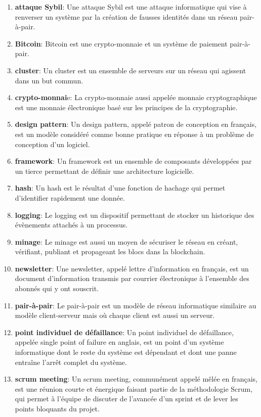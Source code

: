 \documentclass{tnreport}
\begin{document}
\begin{enumerate}
	\item \textbf{attaque Sybil}: Une attaque Sybil est une attaque informatique qui vise à renverser un système par la création de fausses identités dans un réseau pair-à-pair.
	\item \textbf{Bitcoin}: Bitcoin est une crypto-monnaie et un système de paiement pair-à-pair.
	\item \textbf{cluster}: Un cluster est un ensemble de serveurs sur un réseau qui agissent dans un but commun.
	\item \textbf{crypto-monnai}e: La crypto-monnaie aussi appelée monnaie cryptographique est une monnaie électronique basé sur les principes de la cryptographie.
	\item \textbf{design pattern}: Un design pattern, appelé patron de conception en français, est un modèle considéré comme bonne pratique en réponse à un problème de conception d'un logiciel.
	\item \textbf{framework}: Un framework est un ensemble de composants développées par un tierce permettant de définir une architecture logicielle.
	\item \textbf{hash}: Un hash est le résultat d'une fonction de hachage qui permet d'identifier rapidement une donnée.
	\item \textbf{logging}: Le logging est un dispositif permettant de stocker un historique des évènements attachés à un processus.
	\item \textbf{minage}: Le minage est aussi un moyen de sécuriser le réseau en créant, vérifiant, publiant et propageant les blocs dans la blockchain.
	\item \textbf{newsletter}: Une newsletter, appelé lettre d'information en français, est un document d'information transmis par courrier électronique à l'ensemble des abonnés qui y ont souscrit.
	\item \textbf{pair-à-pair}: Le pair-à-pair est un modèle de réseau informatique similaire au modèle client-serveur mais où chaque client est aussi un serveur.
	\item \textbf{point individuel de défaillance}: Un point individuel de défaillance, appelée single point of failure en anglais, est un point d'un système informatique dont le reste du système est dépendant et dont une panne entraîne l'arrêt complet du système.
	\item \textbf{scrum meeting}: Un scrum meeting, communément appelé mêlée en français, est une réunion courte et énergique faisant partie de la méthodologie Scrum, qui permet à l'équipe de discuter de l'avancée d'un sprint et de lever les points bloquants du projet.

\end{enumerate}
\end{document}
